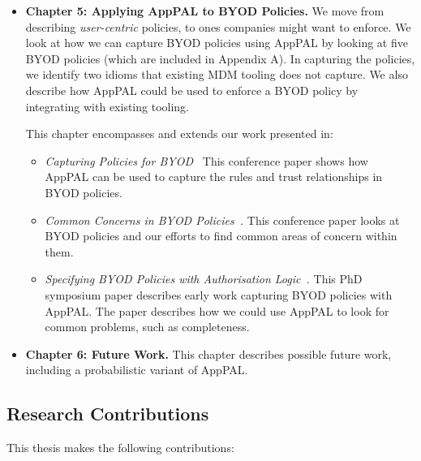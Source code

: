 \documentclass[thesis.tex]{subfiles}
\begin{document}
\begin{itemize}
\item \textbf{Chapter 5: Applying AppPAL to \ac{BYOD} Policies.}
  We move from describing \emph{user-centric} policies, to ones companies might
  want to enforce. We look at how we can capture \ac{BYOD} policies using AppPAL by
  looking at five \ac{BYOD} policies (which are included in Appendix A). In capturing the
  policies, we identify two idioms that existing MDM tooling does not capture. We
  also describe how AppPAL could be used to enforce a \ac{BYOD} policy by integrating
  with existing tooling.
  
  This chapter encompasses and extends our work presented in:
  \begin{itemize}
  \item\emph{Capturing Policies for
      \ac{BYOD}~\cite{hallett_capturing_2017}} This conference paper shows
    how AppPAL can be used to capture the rules and trust relationships in
    \ac{BYOD} policies.
  \item\emph{Common Concerns in \ac{BYOD}
      Policies~\cite{hallett_common_2017}.} This conference paper looks at
    \ac{BYOD} policies and our efforts to find common areas of concern
    within them.
  \item\emph{Specifying \ac{BYOD} Policies with Authorisation
      Logic~\cite{hallett_specifying_2016}.} This PhD symposium paper
    describes early work capturing \ac{BYOD} policies with AppPAL.  The
    paper describes how we could use AppPAL to look for common problems,
    such as completeness.
  \end{itemize}

\item \textbf{Chapter 6: Future Work.}
  This chapter describes possible future work, including a probabilistic variant of AppPAL.
 
\end{itemize}

\subsection{Research Contributions}

This thesis makes the following contributions:
\end{document}
